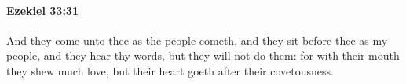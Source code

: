 
		\paragraph{Ezekiel 33:31} %
			\label{EZEKIEL-33-31}

			And they come unto thee as the people cometh, and they sit before thee as my people, and they hear thy words, but they will not do them: for with their mouth they shew much love, but their heart goeth after their covetousness.


